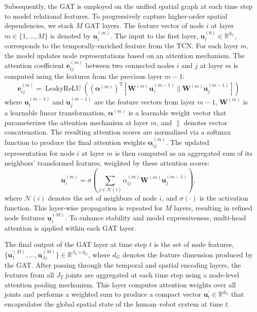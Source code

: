 \documentclass[final,5p,times,twocolumn]{elsarticle}
\begin{document}
Subsequently, the GAT is employed on the unified spatial graph at each time step to model relational features. To progressively capture higher-order spatial dependencies, we stack $M$ GAT layers. The feature vector of node $i$ at layer $m \in \{ 1, \dots, M \}$ is denoted by $\mathbf{u}_i^{(m)}$. The input to the first layer, $\mathbf{u}_i^{(0)} \in \mathbb{R}^{d_C}$, corresponds to the temporally-enriched feature from the TCN. For each layer $m$, the model updates node representations based on an attention mechanism. The attention coefficient $\mathbf{e}_{ij}^{(m)}$ between two connected nodes $i$ and $j$ at layer $m$ is computed using the features from the previous layer $m-1$:
\begin{equation}
    \mathbf{e}_{ij}^{(m)} = \operatorname{LeakyReLU} ((\boldsymbol{\alpha}^{(m)})^{\text{T}} \left[ \mathbf{W}^{(m)} \mathbf{u}_i^{(m-1)} \parallel \mathbf{W}^{(m)} \mathbf{u}_j^{(m-1)} \right])
\end{equation}
where $\mathbf{u}_i^{(m-1)}$ and $\mathbf{u}_j^{(m-1)}$ are the feature vectors from layer $m-1$, $\mathbf{W}^{(m)}$  is a learnable linear transformation, $\boldsymbol{\alpha}^{(m)}$ is a learnable weight vector that parameterizes the attention mechanism at layer $m$, and $\parallel$ denotes vector concatenation. The resulting attention scores are normalized via a softmax function to produce the final attention weights $\boldsymbol{\alpha}_{ij}^{(m)}$. The updated representation for node $i$ at layer $m$ is then computed as an aggregated sum of its neighbors’ transformed features, weighted by these attention scores:
\begin{equation}
    \mathbf{u}_i^{(m)} = \sigma\left( \sum_{j \in \mathcal{N}(i)} \alpha_{ij}^{(m)} \mathbf{W}^{(m)} \mathbf{u}_j^{(m-1)} \right),
\end{equation}
where $\mathcal{N}(i)$ denotes the set of neighbors of node $i$, and $\sigma(\cdot)$ is the activation function. This layer-wise propagation is repeated for $M$ layers, resulting in refined node features $\mathbf{u}_i^{(M)}$. To enhance stability and model expressiveness, multi-head attention is applied within each GAT layer.

The final output of the GAT layer at time step $t$ is the set of node features, $ \{ \mathbf{u}_1^{(M)}, \dots, \mathbf{u}_{J_T}^{(M)} \} \in \mathbb{R}^{J_T \times d_G}$, where $d_G$ denotes the feature dimension produced by the GAT. After passing through the temporal and spatial encoding layers, the features from all $J_T$ joints are aggregated at each time step using a node-level attention pooling mechanism. This layer computes attention weights over all joints and performs a weighted sum to produce a compact vector $\mathbf{u}_t^\prime \in \mathbb{R}^{d_G}$ that encapsulates the global spatial state of the human–robot system at time $t$.
\end{document}
